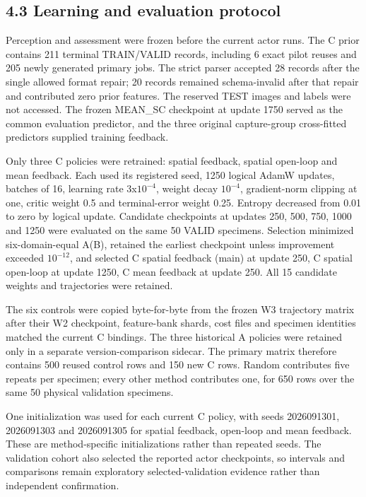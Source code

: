 \hypertarget{learning-and-evaluation-protocol}{%
\subsection{4.3 Learning and evaluation protocol}\label{learning-and-evaluation-protocol}}

Perception and assessment were frozen before the current actor runs. The C prior contains 211 terminal TRAIN/VALID records, including 6 exact pilot reuses and 205 newly generated primary jobs. The strict parser accepted 28 records after the single allowed format repair; 20 records remained schema-invalid after that repair and contributed zero prior features. The reserved TEST images and labels were not accessed. The frozen MEAN\_SC checkpoint at update 1750 served as the common evaluation predictor, and the three original capture-group cross-fitted predictors supplied training feedback.

Only three C policies were retrained: spatial feedback, spatial open-loop and mean feedback. Each used its registered seed, 1250 logical AdamW updates, batches of 16, learning rate 3x\(10^{-4}\), weight decay \(10^{-4}\), gradient-norm clipping at one, critic weight 0.5 and terminal-error weight 0.25. Entropy decreased from 0.01 to zero by logical update. Candidate checkpoints at updates 250, 500, 750, 1000 and 1250 were evaluated on the same 50 VALID specimens. Selection minimized six-domain-equal A(B), retained the earliest checkpoint unless improvement exceeded \(10^{-12}\), and selected C spatial feedback (main) at update 250, C spatial open-loop at update 1250, C mean feedback at update 250. All 15 candidate weights and trajectories were retained.

The six controls were copied byte-for-byte from the frozen W3 trajectory matrix after their W2 checkpoint, feature-bank shards, cost files and specimen identities matched the current C bindings. The three historical A policies were retained only in a separate version-comparison sidecar. The primary matrix therefore contains 500 reused control rows and 150 new C rows. Random contributes five repeats per specimen; every other method contributes one, for 650 rows over the same 50 physical validation specimens.

One initialization was used for each current C policy, with seeds 2026091301, 2026091303 and 2026091305 for spatial feedback, open-loop and mean feedback. These are method-specific initializations rather than repeated seeds. The validation cohort also selected the reported actor checkpoints, so intervals and comparisons remain exploratory selected-validation evidence rather than independent confirmation.

